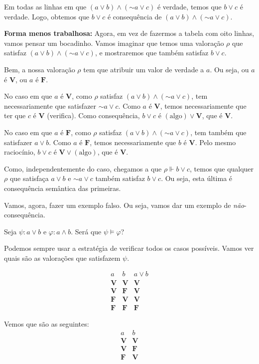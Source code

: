 \documentclass{article}
\theoremstyle{definition}
\theoremstyle{remark}
\newcommand{\V}{\mathbf{V}}
\newcommand{\F}{\mathbf{F}}
\newcommand*{\lneg}{\mathord{\sim}}
\begin{document}
	Em todas as linhas em que $(a \lor b) \land (\lneg a \lor c)$ é verdade, temos que $b \lor c$ é verdade. Logo, obtemos que $b \lor c$ é consequência de $(a \lor b) \land (\lneg a \lor c)$.
	
	\medskip
	
	\textbf{Forma menos trabalhosa:} Agora, em vez de fazermos a tabela com oito linhas, vamos pensar um bocadinho. Vamos imaginar que temos uma valoração $\rho$ que satisfaz $(a\lor b) \land (\lneg a \lor c)$, e mostraremos que também satisfaz $b \lor c$.
	
	Bem, a nossa valoração $\rho$ tem que atribuir um valor de verdade a $a$. Ou seja, ou $a$ é $\V$, ou $a$ é $\F$.
	
	No caso em que $a$ é $\V$, como $\rho$ satisfaz $(a\lor b) \land (\lneg a \lor c)$, tem necessariamente que satisfazer $\lneg a \lor c$. Como $a$ é $\V$, temos necessariamente que ter que $c$ é $\V$ (verifica). Como consequência, $b \lor c$ é $(\text{algo}) \lor \V$, que é $\V$.
	
	No caso em que $a$ é $\F$, como $\rho$ satisfaz $(a\lor b) \land (\lneg a \lor c)$, tem também que satisfazer $a \lor b$. Como $a$ é $\F$, temos necessariamente que $b$ é $\V$. Pelo mesmo raciocínio, $b \lor c$ é $\V \lor (\text{algo})$, que é $\V$.
	
	Como, independentemente do caso, chegamos a que $\rho \Vdash b \lor c$, temos que qualquer $\rho$ que satisfaça $a\lor b$ e $\lneg a \lor c$ também satisfaz $b \lor c$. Ou seja, esta última é consequência semântica das primeiras.
	
	\smallskip
	
	Vamos, agora, fazer um exemplo falso. Ou seja, vamos dar um exemplo de \emph{não}-consequência.
	
	Seja $\psi : a \lor b$ e $\varphi : a \land b$. Será que $\psi \vDash \varphi$?
	
	Podemos sempre usar a estratégia de verificar todos os casos possíveis. Vamos ver quais são as valorações que satisfazem $\psi$.
	
	\[
	\begin{array}{c|c|c}
	a&b&a\lor b\\
	\hline
	\V&\V&\V\\
	\V&\F&\V\\
	\F&\V&\V\\
	\F&\F&\F
	\end{array}
	\]
	
	Vemos que são as seguintes:
	\[
	\begin{array}{c|c}
	a&b\\
	\hline
	\V&\V\\
	\V&\F\\
	\F&\V
	\end{array}
	\]
	
\end{document}
